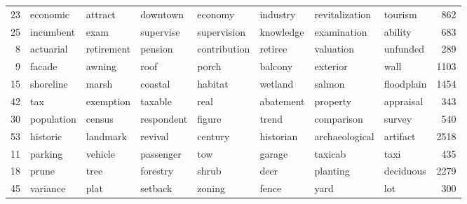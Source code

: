 \begin{table}[ht]
\begin{tabular}{rlllllllr}
   23 & \cellcolor{white}economic & \cellcolor{white}attract & \cellcolor{white}downtown & \cellcolor{white}economy & \cellcolor{white}industry & \cellcolor{white}revitalization & \cellcolor{white}tourism & 862 \\ 
   25 & \cellcolor{white}incumbent & \cellcolor{white}exam & \cellcolor{white}supervise & \cellcolor{white}supervision & \cellcolor{white}knowledge & \cellcolor{white}examination & \cellcolor{white}ability & 683 \\ 
    8 & \cellcolor{white}actuarial & \cellcolor{white}retirement & \cellcolor{white}pension & \cellcolor{white}contribution & \cellcolor{white}retiree & \cellcolor{white}valuation & \cellcolor{white}unfunded & 289 \\ 
    9 & \cellcolor{white}facade & \cellcolor{white}awning & \cellcolor{white}roof & \cellcolor{white}porch & \cellcolor{white}balcony & \cellcolor{white}exterior & \cellcolor{white}wall & 1103 \\ 
   15 & \cellcolor{white}shoreline & \cellcolor{white}marsh & \cellcolor{white}coastal & \cellcolor{white}habitat & \cellcolor{white}wetland & \cellcolor{white}salmon & \cellcolor{white}floodplain & 1454 \\ 
   42 & \cellcolor{white}tax & \cellcolor{white}exemption & \cellcolor{white}taxable & \cellcolor{white}real & \cellcolor{white}abatement & \cellcolor{white}property & \cellcolor{white}appraisal & 343 \\ 
   30 & \cellcolor{blue!10}population & \cellcolor{blue!10}census & \cellcolor{blue!10}respondent & \cellcolor{blue!10}figure & \cellcolor{blue!10}trend & \cellcolor{blue!10}comparison & \cellcolor{blue!10}survey & 540 \\ 
   53 & \cellcolor{blue!10}historic & \cellcolor{blue!10}landmark & \cellcolor{blue!10}revival & \cellcolor{blue!10}century & \cellcolor{blue!10}historian & \cellcolor{blue!10}archaeological & \cellcolor{blue!10}artifact & 2518 \\ 
   11 & \cellcolor{blue!10}parking & \cellcolor{blue!10}vehicle & \cellcolor{blue!10}passenger & \cellcolor{blue!10}tow & \cellcolor{blue!10}garage & \cellcolor{blue!10}taxicab & \cellcolor{blue!10}taxi & 435 \\ 
   18 & \cellcolor{blue!10}prune & \cellcolor{blue!10}tree & \cellcolor{blue!10}forestry & \cellcolor{blue!10}shrub & \cellcolor{blue!10}deer & \cellcolor{blue!10}planting & \cellcolor{blue!10}deciduous & 2279 \\ 
   45 & \cellcolor{blue!10}variance & \cellcolor{blue!10}plat & \cellcolor{blue!10}setback & \cellcolor{blue!10}zoning & \cellcolor{blue!10}fence & \cellcolor{blue!10}yard & \cellcolor{blue!10}lot & 300 \\ 

\end{tabular}
\end{table}

